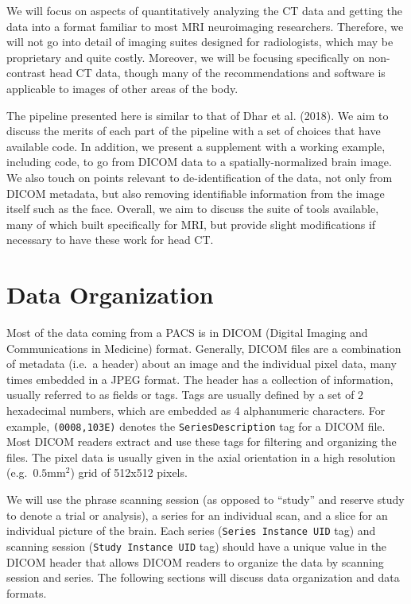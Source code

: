 \documentclass[]{elsarticle} %
\begin{document}
We will focus on aspects of quantitatively analyzing the CT data and getting the data into a format familiar to most MRI neuroimaging researchers. Therefore, we will not go into detail of imaging suites designed for radiologists, which may be proprietary and quite costly. Moreover, we will be focusing specifically on non-contrast head CT data, though many of the recommendations and software is applicable to images of other areas of the body.

The pipeline presented here is similar to that of Dhar et al. (2018). We aim to discuss the merits of each part of the pipeline with a set of choices that have available code. In addition, we present a supplement with a working example, including code, to go from DICOM data to a spatially-normalized brain image. We also touch on points relevant to de-identification of the data, not only from DICOM metadata, but also removing identifiable information from the image itself such as the face. Overall, we aim to discuss the suite of tools available, many of which built specifically for MRI, but provide slight modifications if necessary to have these work for head CT.

\hypertarget{data-organization}{%
\section{Data Organization}\label{data-organization}}

Most of the data coming from a PACS is in DICOM (Digital Imaging and Communications in Medicine) format. Generally, DICOM files are a combination of metadata (i.e.~a header) about an image and the individual pixel data, many times embedded in a JPEG format. The header has a collection of information, usually referred to as fields or tags. Tags are usually defined by a set of 2 hexadecimal numbers, which are embedded as 4 alphanumeric characters. For example, \texttt{(0008,103E)} denotes the \texttt{SeriesDescription} tag for a DICOM file. Most DICOM readers extract and use these tags for filtering and organizing the files. The pixel data is usually given in the axial orientation in a high resolution (e.g.~\(0.5\)mm\(^2\)) grid of 512x512 pixels.

We will use the phrase scanning session (as opposed to ``study'' and reserve study to denote a trial or analysis), a series for an individual scan, and a slice for an individual picture of the brain. Each series (\texttt{Series\ Instance\ UID} tag) and scanning session (\texttt{Study\ Instance\ UID} tag) should have a unique value in the DICOM header that allows DICOM readers to organize the data by scanning session and series. The following sections will discuss data organization and data formats.
\end{document}
